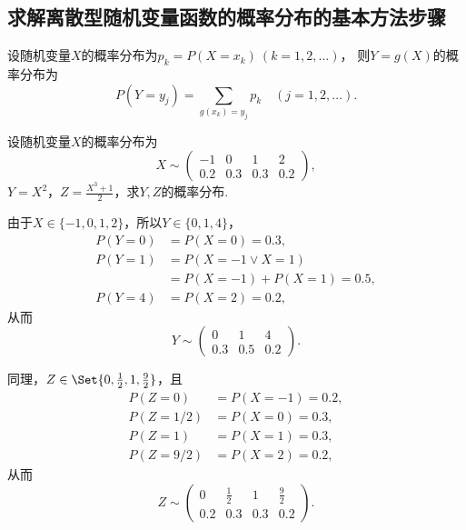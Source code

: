 \subsection{求解离散型随机变量函数的概率分布的基本方法步骤}
设随机变量\(X\)的概率分布为\(p_k = P(X = x_k)\ (k=1,2,\dotsc)\)，
则\(Y = g(X)\)的概率分布为\[
P(Y = y_j) = \sum_{g(x_k) = y_j} p_k
\quad(j=1,2,\dotsc).
\]

\begin{example}
设随机变量\(X\)的概率分布为\[
X \sim \begin{pmatrix}
-1 & 0 & 1 & 2 \\
0.2 & 0.3 & 0.3 & 0.2
\end{pmatrix},
\]\(Y=X^2\)，\(Z=\frac{X^3+1}{2}\)，求\(Y,Z\)的概率分布.
\begin{solution}
由于\(X\in\{-1,0,1,2\}\)，所以\(Y\in\{0,1,4\}\)，\begin{align*}
P(Y=0) &= P(X=0) = 0.3, \\
P(Y=1) &= P(X=-1 \lor X=1) \\
	&= P(X=-1) + P(X=1)
	= 0.5, \\
P(Y=4) &= P(X=2) = 0.2,
\end{align*}
从而\[
Y \sim \begin{pmatrix}
0 & 1 & 4 \\
0.3 & 0.5 & 0.2
\end{pmatrix}.
\]

同理，\(Z\in\Set{0,\frac{1}{2},1,\frac{9}{2}}\)，且\begin{align*}
P(Z=0) &= P(X=-1) = 0.2, \\
P(Z=1/2) &= P(X=0) = 0.3, \\
P(Z=1) &= P(X=1) = 0.3, \\
P(Z=9/2) &= P(X=2) = 0.2,
\end{align*}
从而\[
Z \sim \begin{pmatrix}
0 & \frac{1}{2} & 1 & \frac{9}{2} \\
0.2 & 0.3 & 0.3 & 0.2
\end{pmatrix}.
\]
\end{solution}
\end{example}

